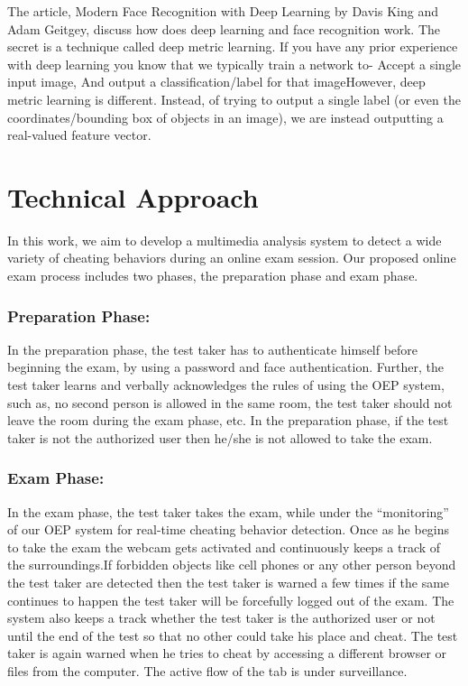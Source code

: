 \documentclass[12pt]{report}
\begin{document}
The article, Modern Face Recognition with Deep Learning by Davis King and Adam Geitgey, discuss how does deep learning and face recognition work. The secret is a technique called deep metric learning.
If you have any prior experience with deep learning you know that we typically train a network to- Accept a single input image, And output a classification/label for that imageHowever, deep metric learning is different.
Instead, of trying to output a single label (or even the coordinates/bounding box of objects in an image), we are instead outputting a real-valued feature vector.
\newpage
\section{Technical Approach}
In this work, we aim to develop a multimedia analysis system to detect a wide variety of cheating behaviors during an online exam session. Our proposed online exam process includes two phases, the preparation phase and exam phase.
\subsubsection{Preparation Phase:}
 In the preparation phase, the test taker has to authenticate himself before beginning the exam, by using a password and face authentication. Further, the test taker learns and verbally acknowledges the rules of using the OEP system, such as, no second person is allowed in the same room, the test taker should not leave the room during the exam phase, etc. In the preparation phase, if the test taker is not the authorized user then he/she is not allowed to take the exam.
\subsubsection{Exam Phase:}
In the exam phase, the test taker takes the exam, while under the “monitoring” of our OEP system for real-time cheating behavior detection. Once as he begins to take the exam the webcam gets activated and continuously keeps a track of the surroundings.If forbidden objects like cell phones or any other person beyond the test taker are detected then the test taker is warned a few times if the same continues to happen the test taker will be forcefully logged out of the exam. The system also keeps a track whether the test taker is the authorized user or not until the end of the test so that no other could take his place and cheat. The test taker is again warned when he tries to cheat by accessing a different browser or files from the computer. The active flow of the tab is under surveillance.
\newpage
\end{document}
